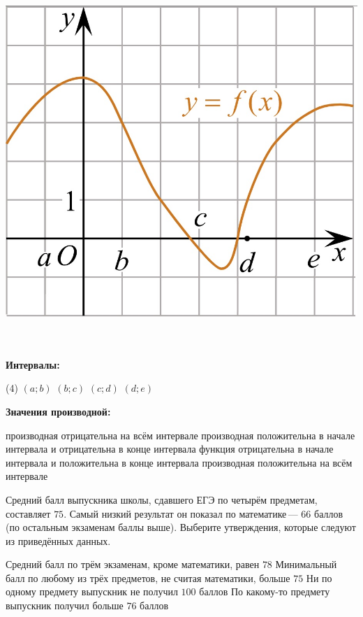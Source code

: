 \begin{homework}[number=3]
\begin{listofex}
\begin{minipage}[t]{\picwidth}
			\includegraphics[align=t, width=\linewidth]{../pics/G101M8H3-7}
		\end{minipage}
		\\
		\\
		\textbf{Интервалы:}
		\begin{tasks}(4)
			\task \( (a;b) \)
			\task \( (b;c) \)
			\task \( (c;d) \)
			\task \( (d;e) \)
		\end{tasks}
		\textbf{Значения производной:}
		\begin{tasks}
			\task производная отрицательна на всём интервале
			\task производная положительна в начале интервала и отрицательна в конце интервала
			\task функция отрицательна в начале интервала и положительна в конце интервала
			\task производная положительна на всём интервале
		\end{tasks}
		\item Средний балл выпускника школы, сдавшего ЕГЭ по четырём предметам, составляет \(75\). Самый низкий результат он показал по математике --- \(66\) баллов (по остальным экзаменам баллы выше). Выберите утверждения, которые следуют из приведённых данных.
		\begin{tasks}
			\task Средний балл по трём экзаменам, кроме математики, равен \(78\)
			\task Минимальный балл по любому из трёх предметов, не считая математики, больше \(75\)
			\task Ни по одному предмету выпускник не получил \(100\) баллов
			\task По какому-то предмету выпускник получил больше \(76\) баллов
		\end{tasks}

\end{listofex}
\end{homework}
